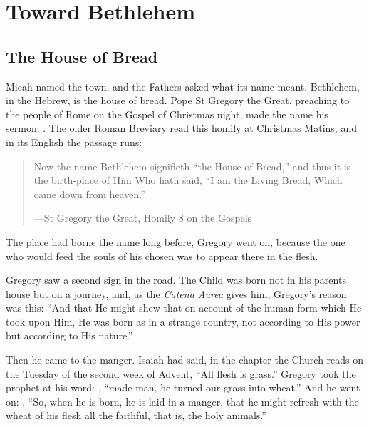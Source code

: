 \section{Toward Bethlehem}

\subsection{The House of Bread}\label{sec:bread}

Micah named the town, and the Fathers asked what its name meant. Bethlehem, in
the Hebrew, is the house of bread. Pope St Gregory the Great, preaching to the
people of Rome on the Gospel of Christmas night, made the name his sermon:
. The older Roman Breviary read this homily
at Christmas Matins, and in its English the passage runs:

\begin{quote}
Now the name Bethlehem signifieth ``the House of Bread,'' and thus it is the
birth-place of Him Who hath said, ``I am the Living Bread, Which came down from
heaven.''\par
{\smallskip\noindent\small ---St Gregory the Great, Homily 8 on the Gospels\par}
\end{quote}

\noindent The place had borne the name long before, Gregory went on, because
the one who would feed the souls of his chosen was to appear there in the flesh.

Gregory saw a second sign in the road. The Child was born not in his parents'
house but on a journey, and, as the \emph{Catena Aurea} gives him, Gregory's reason was
this: ``And that He might shew that on account of the human form which He
took upon Him, He was born as in a strange country, not according to His power
but according to His nature.''

Then he came to the manger. Isaiah had said, in the chapter the Church reads on
the Tuesday of the second week of Advent, ``All flesh is grass.'' Gregory took
the prophet at his word: ,
``made man, he turned our grass into wheat.'' And he went on: , ``So, when he is born, he is laid in a manger, that he
might refresh with the wheat of his flesh all the faithful, that is, the holy
animals.''

